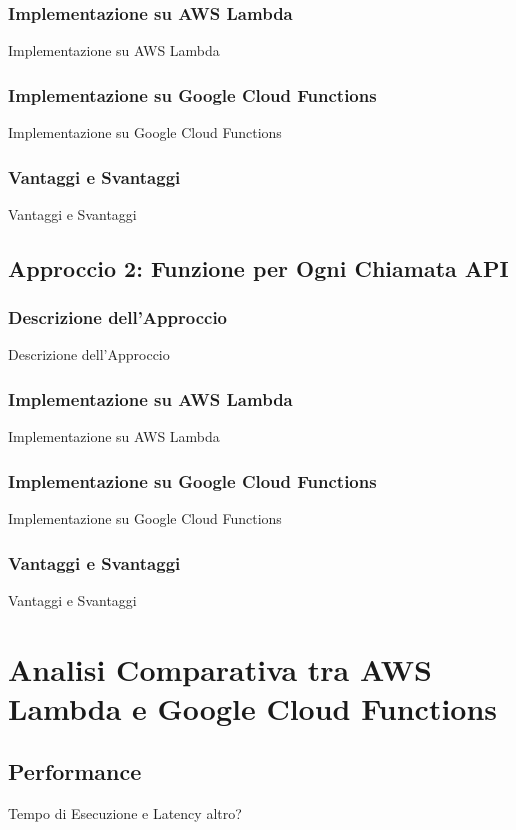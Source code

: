 \documentclass[12pt,a4paper,twoside]{book}
\begin{document}
\subsection{Implementazione su AWS Lambda}
Implementazione su AWS Lambda

\subsection{Implementazione su Google Cloud Functions}
Implementazione su Google Cloud Functions

\subsection{Vantaggi e Svantaggi}
Vantaggi e Svantaggi

\section{Approccio 2: Funzione per Ogni Chiamata API}
\subsection{Descrizione dell’Approccio}
Descrizione dell’Approccio

\subsection{Implementazione su AWS Lambda}
Implementazione su AWS Lambda

\subsection{Implementazione su Google Cloud Functions}
Implementazione su Google Cloud Functions

\subsection{Vantaggi e Svantaggi}
Vantaggi e Svantaggi

\chapter{Analisi Comparativa tra AWS Lambda e Google Cloud Functions}
\section{Performance}
Tempo di Esecuzione e Latency
altro?
\end{document}
